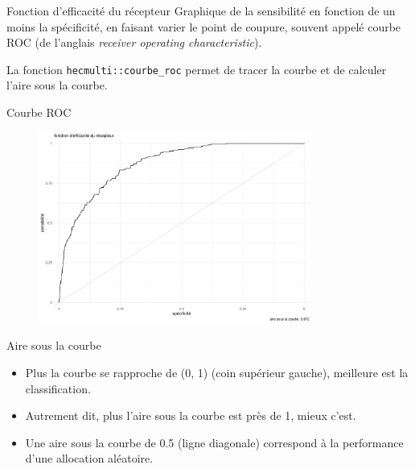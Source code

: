 \documentclass[
  ignorenonframetext,
]{beamer}
\newenvironment{Shaded}{\begin{snugshade}}{\end{snugshade}}
\newcommand{\AttributeTok}[1]{\textcolor[rgb]{0.40,0.45,0.13}{#1}}
\newcommand{\ConstantTok}[1]{\textcolor[rgb]{0.56,0.35,0.01}{#1}}
\newcommand{\DocumentationTok}[1]{\textcolor[rgb]{0.37,0.37,0.37}{\textit{#1}}}
\newcommand{\FunctionTok}[1]{\textcolor[rgb]{0.28,0.35,0.67}{#1}}
\newcommand{\NormalTok}[1]{\textcolor[rgb]{0.00,0.23,0.31}{#1}}
\newcommand{\OtherTok}[1]{\textcolor[rgb]{0.00,0.23,0.31}{#1}}
\newcommand{\SpecialCharTok}[1]{\textcolor[rgb]{0.37,0.37,0.37}{#1}}
\providecommand{\tightlist}{%
  \setlength{\itemsep}{0pt}\setlength{\parskip}{0pt}}\usepackage{longtable,booktabs,array}
\begin{document}
\begin{frame}[fragile]{Fonction d'efficacité du récepteur}
\protect\hypertarget{fonction-defficacituxe9-du-ruxe9cepteur}{}
Graphique de la sensibilité en fonction de un moins la spécificité, en
faisant varier le point de coupure, souvent appelé courbe ROC (de
l'anglais \emph{receiver operating characteristic}).

La fonction \texttt{hecmulti::courbe\_roc} permet de tracer la courbe et
de calculer l'aire sous la courbe.

\begin{Shaded}
\end{Shaded}
\end{frame}

\begin{frame}{Courbe ROC}
\protect\hypertarget{courbe-roc}{}
\begin{figure}

{\centering \includegraphics[width=0.8\textwidth,height=\textheight]{MATH60602-diapos6_files/figure-beamer/unnamed-chunk-15-1.pdf}

}

\end{figure}
\end{frame}

\begin{frame}{Aire sous la courbe}
\protect\hypertarget{aire-sous-la-courbe}{}
\begin{itemize}
\tightlist
\item
  Plus la courbe se rapproche de (0, 1) (coin supérieur gauche),
  meilleure est la classification.
\item
  Autrement dit, plus l'aire sous la courbe est près de 1, mieux c'est.
\item
  Une aire sous la courbe de 0.5 (ligne diagonale) correspond à la
  performance d'une allocation aléatoire.
\end{itemize}
\end{frame}
\end{document}
